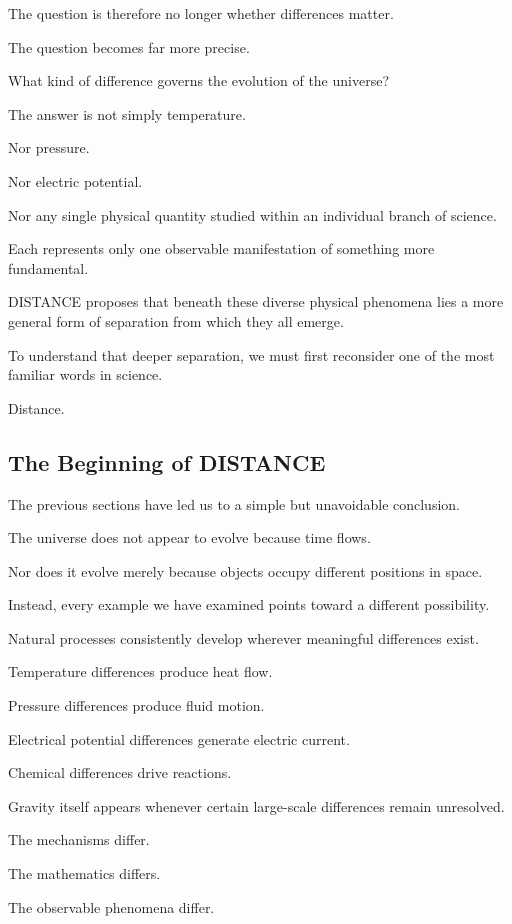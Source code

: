 The question is therefore no longer whether differences matter.

The question becomes far more precise.

What kind of difference governs the evolution of the universe?

The answer is not simply temperature.

Nor pressure.

Nor electric potential.

Nor any single physical quantity studied within an individual branch of science.

Each represents only one observable manifestation of something more fundamental.

DISTANCE proposes that beneath these diverse physical phenomena lies a more general form of separation from which they all emerge.

To understand that deeper separation, we must first reconsider one of the most familiar words in science.

Distance.

\subsection{\textbf{The Beginning of DISTANCE}} 


The previous sections have led us to a simple but unavoidable conclusion.

The universe does not appear to evolve because time flows.

Nor does it evolve merely because objects occupy different positions in space.

Instead, every example we have examined points toward a different possibility.

Natural processes consistently develop wherever meaningful differences exist.

Temperature differences produce heat flow.

Pressure differences produce fluid motion.

Electrical potential differences generate electric current.

Chemical differences drive reactions.

Gravity itself appears whenever certain large-scale differences remain unresolved.

The mechanisms differ.

The mathematics differs.

The observable phenomena differ.

